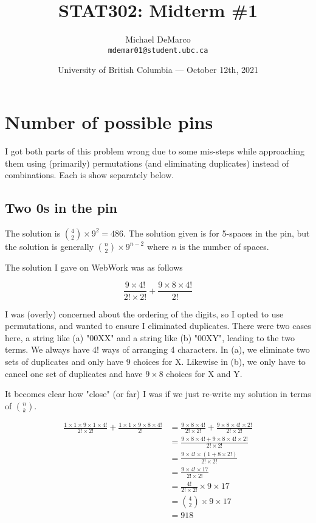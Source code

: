 \documentclass{article}
\title{STAT302: Midterm \#1}
\author{Michael DeMarco\\ \texttt{mdemar01@student.ubc.ca}}
\date{University of British Columbia --- October 12th, 2021}
\begin{document}
\maketitle %

\section{Number of possible pins}

I got both parts of this problem wrong due to some mis-steps while approaching them using (primarily) permutations (and eliminating duplicates) instead of combinations. Each is show separately below.

\subsection{Two 0s in the pin}

The solution is $\binom{4}{2} \times 9^2 = 486$. The solution given is for 5-spaces in the pin, but the solution is generally $\binom{n}{2} \times 9^{n-2}$ where $n$ is the number of spaces.

The solution I gave on WebWork was as follows

$$\frac{9\times4!}{2!\times2!} + \frac{9\times8\times4!}{2!}$$

I was (overly) concerned about the ordering of the digits, so I opted to use permutations, and wanted to ensure I eliminated duplicates. There were two cases here, a string like (a) "00XX" and a string like (b) "00XY", leading to the two terms. We always have $4!$ ways of arranging 4 characters. In (a), we eliminate two sets of duplicates and only have 9 choices for X. Likewise in (b), we only have to cancel one set of duplicates and have $9 \times 8$ choices for X and Y.

It becomes clear how "close" (or far) I was if we just re-write my solution in terms of $\binom{n}{k}$.

\begin{equation}
	\begin{split}
		\frac{1\times1\times9\times1\times4!}{2!\times2!} + \frac{1\times1\times9\times8\times4!}{2!} & = \frac{9\times8\times4!}{2!\times2!} + \frac{9\times8\times4!\times2!}{2!\times2!} \\
		& = \frac{9\times8\times4! + 9\times8\times4!\times2!}{2!\times2!} \\
		& = \frac{9\times4!\times(1 + 8\times2!)}{2!\times2!} \\
		& = \frac{9\times4!\times17}{2!\times2!} \\
		& = \frac{4!}{2!\times2!}\times9\times17 \\
		& = \binom{4}{2}\times9\times17\\
		& = 918
	\end{split}
\end{equation}
\end{document}

